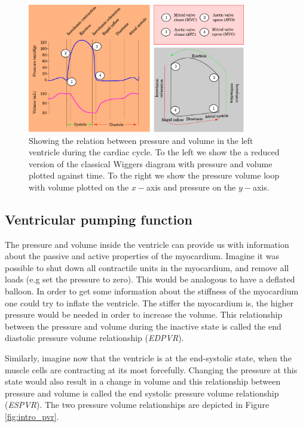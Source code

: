 \begin{figure}[htbp]
  \centering
    \includegraphics[width=0.85\textwidth]{chapters/introduction/figures/cardiac_cycle.png}
\caption{Showing the relation between pressure and volume in the left
  ventricle during the cardiac cycle. To the left we show the a reduced version of
the classical Wiggers diagram with pressure and volume plotted against
time. To the right we show the pressure volume loop
with volume plotted on the $x-$axis and pressure on the $y-$axis. }
\label{fig:pv_loop}
\end{figure}


\subsection{Ventricular pumping function}
\label{sec:ventricular_pumping_function}



The pressure and volume inside the ventricle can provide us with
information about the passive and active properties of the
myocardium. Imagine it was possible to shut down all contractile
units in the myocardium, and remove all loads (e.g set the pressure
to zero). This would be analogous to have a deflated balloon. In order to
get some information about the stiffness of the myocardium one could
try to inflate the ventricle. The stiffer the myocardium is, the
higher pressure would be needed in order to increase the volume.
This relationship between the pressure and volume during the inactive
state is called the end diastolic pressure volume relationship
(\emph{EDPVR}).

Similarly, imagine now that the ventricle is at the end-systolic state,
when the muscle cells are contracting at its most forcefully. Changing
the pressure at this state would also result in a change in volume and
this relationship between pressure and volume  is called the end
systolic pressure volume relationship (\emph{ESPVR}). The two pressure
volume relationships are depicted in Figure \ref{fig:intro_pvr}.

